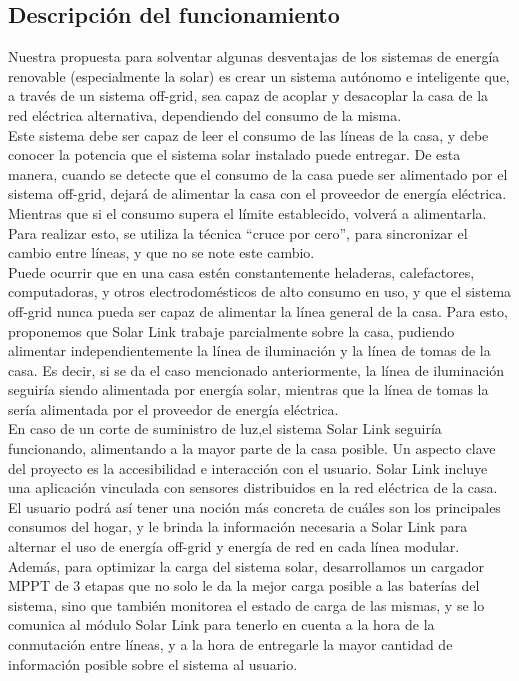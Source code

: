 \subsection{Descripción del funcionamiento}
Nuestra propuesta para solventar algunas desventajas de los sistemas de energía renovable (especialmente la solar) es crear un sistema autónomo e inteligente que, a través de un sistema off-grid, sea capaz de acoplar y desacoplar la casa de la red eléctrica alternativa, dependiendo del consumo de la misma.\\

Este sistema debe ser capaz de leer el consumo de las líneas de la casa, y debe conocer la potencia que el sistema solar instalado puede entregar. De esta manera, cuando se detecte que el consumo de la casa puede ser alimentado por el sistema off-grid, dejará de alimentar la casa con el proveedor de energía eléctrica. Mientras que si el consumo supera el límite establecido, volverá a alimentarla. Para realizar esto, se utiliza la técnica “cruce por cero”, para sincronizar el cambio entre líneas, y que no se note este cambio.\\

Puede ocurrir que en una casa estén constantemente heladeras, calefactores, computadoras, y otros electrodomésticos de alto consumo en uso, y que el sistema off-grid nunca pueda ser capaz de alimentar la línea general de la casa. Para esto, proponemos que Solar Link trabaje parcialmente sobre la casa, pudiendo alimentar independientemente la línea de iluminación y la línea de tomas de la casa. Es decir, si se da el caso mencionado anteriormente, la línea de iluminación seguiría siendo alimentada por energía solar, mientras que la línea de tomas la sería alimentada por el proveedor de energía eléctrica.\\

En caso de un corte de suministro de luz,el sistema Solar Link seguiría funcionando, alimentando a la mayor parte de la casa posible.
Un aspecto clave del proyecto es la accesibilidad e interacción con el usuario. Solar Link incluye una aplicación vinculada con sensores distribuidos en la red eléctrica de la casa. El usuario podrá así tener una noción más concreta de cuáles son los principales consumos del hogar, y le brinda la información necesaria a Solar Link para alternar el uso de energía off-grid y energía de red en cada línea modular.\\

Además, para optimizar la carga del sistema solar, desarrollamos un cargador MPPT de 3 etapas que no solo le da la mejor carga posible a las baterías del sistema, sino que también monitorea el estado de carga de las mismas, y se lo comunica al módulo Solar Link para tenerlo en cuenta a la hora de la conmutación entre líneas, y a la hora de entregarle la mayor cantidad de información posible sobre el sistema al usuario.\\

